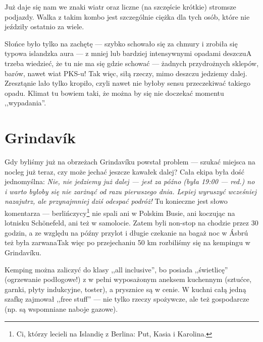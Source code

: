 Już daje się nam we znaki wiatr oraz liczne (na szczęście krótkie) stromsze podjazdy. Walka z takim kombo jest szczególnie ciężka dla tych osób, które nie jeździły ostatnio za wiele.



\clearpage



Słońce było tylko na zachętę --- szybko schowało się za chmury i zrobiła się typowa islandzka aura --- z mniej lub bardziej intensywnymi opadami deszczu\textellipsis A trzeba wiedzieć, że tu nie ma się gdzie schować --- żadnych przydrożnych sklepów, barów, nawet wiat PKS-u! Tak więc, siłą rzeczy, mimo deszczu jedziemy dalej. Zresztą\textellipsis nie lało tylko kropiło, czyli nawet nie byłoby sensu przeczekiwać takiego opadu. Klimat tu bowiem taki, że można by się nie doczekać momentu ,,wypadania''.

\section*{Grindavík}

Gdy byliśmy już na obrzeżach Grindavíku powstał problem --- szukać miejsca na nocleg już teraz, czy może jechać jeszcze kawałek dalej? Cała ekipa była dość jednomyślna: \emph{Nie, nie jedziemy już dalej --- jest za późno (była 19:00 --- red.) no i warto byłoby się nie zarżnąć od razu pierwszego dnia. Lepiej wyruszyć wcześniej nazajutrz, ale przynajmniej dziś odespać podróż!} Tu konieczne jest słowo komentarza --- berlińczycy\footnote{Ci, którzy lecieli na Islandię z Berlina: Put, Kasia i Karolina.} nie spali ani w Polskim Busie, ani koczując na lotnisku Schönefeld, ani też w samolocie. Zatem byli non-stop na chodzie przez 30 godzin, a ze względu na późny przylot i długie czekanie na bagaż noc w Ásbrú też była zarwana\textellipsis Tak więc po przejechaniu 50 km rozbiliśmy się na kempingu w Grindavíku.

Kemping można zaliczyć do klasy ,,all inclusive'', bo posiada ,,świetlicę'' (ogrzewanie podłogowe!) z w pełni wyposażonym aneksem kuchennym (sztućce, garnki, płyty indukcyjne, toster\textellipsis), a prysznice są w cenie. W kuchni całą jedną szafkę zajmował ,,free stuff'' --- nie tylko rzeczy spożywcze, ale też gospodarcze (np. są wspomniane naboje gazowe).

